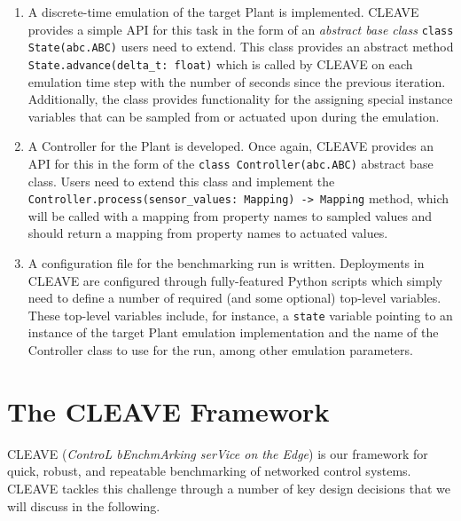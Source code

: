 \begin{enumerate}
    \item A discrete-time emulation of the target Plant is implemented.
    CLEAVE provides a simple API for this task in the form of an \emph{abstract base class} \texttt{class State(abc.ABC)} users need to extend.
    This class provides an abstract method \texttt{State.advance(delta_t: float)} which is called by CLEAVE on each emulation time step with the number of seconds since the previous iteration.
    Additionally, the class provides functionality for the assigning special instance variables that can be sampled from or actuated upon during the emulation.

    \item A Controller for the Plant is developed.
    Once again, CLEAVE provides an API for this in the form of the \texttt{class Controller(abc.ABC)} abstract base class.
    Users need to extend this class and implement the \texttt{Controller.process(sensor_values: Mapping) -> Mapping} method, which will be called with a mapping from property names to sampled values and should return a mapping from property names to actuated values.
    
    \item A configuration file for the benchmarking run is written.
    Deployments in CLEAVE are configured through fully-featured Python scripts which simply need to define a number of required (and some optional) top-level variables.
    These top-level variables include, for instance, a \texttt{state} variable pointing to an instance of the target Plant emulation implementation and the name of the Controller class to use for the run, among other emulation parameters.
    
\end{enumerate}

\section{The CLEAVE Framework}\label{sec:cleave}

CLEAVE (\emph{ControL bEnchmArking serVice on the Edge}) is our framework for quick, robust, and repeatable benchmarking of networked control systems.
CLEAVE tackles this challenge through a number of key design decisions that we will discuss in the following.


